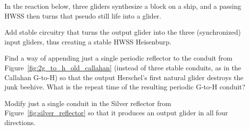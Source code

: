 \begin{multicols}{2}
	\mfilbreak
	
	
	\begin{problem}\label{exer:create_hwss_heisenburp} 
		In the reaction below, three gliders synthesize a block on a ship, and a passing HWSS then turns that pseudo still life into a glider.
		
		\begin{center}
		\end{center}
	
		\noindent Add stable circuitry that turns the output glider into the three (synchronized) input gliders, thus creating a stable HWSS Heisenburp.
	\end{problem}
	
	
	\mfilbreak
	
	
	\begin{problem}\label{exer:callahan_g_to_h_faster_periodic} 
		Find a way of appending just a single periodic reflector to the conduit from Figure~\ref{fig:2g_to_h_old_callahan} (instead of three stable conduits, as in the Callahan G-to-H) so that the output Herschel's first natural glider destroys the junk beehive. What is the repeat time of the resulting periodic G-to-H conduit?
	\end{problem}
	
	
	\mfilbreak
	
	
	\begin{problemstar}\label{exer:four_dir_silver_reflector} 
		Modify just a single conduit in the Silver reflector from Figure~\ref{fig:silver_reflector} so that it produces an output glider in all four directions.
	\end{problemstar}
	
	
\end{multicols}
\normalsize\vspace*{0.01cm}
